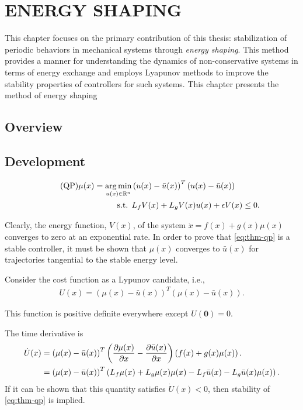 \chapter{\uppercase{Energy Shaping}}

This chapter focuses on the primary contribution of this thesis: stabilization of periodic behaviors in mechanical systems through {\em energy shaping}.
%
This method provides a manner for understanding the dynamics of non-conservative systems in terms of energy exchange and employs Lyapunov methods to improve the stability properties of controllers for such systems.
%
This chapter presents the method of energy shaping 

\section{Overview}

\section{Development}

\begin{align}
  \label{eq:thm-qp} \tag {QP}
  \mu(x) = \operatorname*{arg\,min}_{u(x) \in \mathbb{R}^{n}} & \left(u(x) - {\bar u}(x)\right)^T \left(u(x) - {\bar u}(x) \right)\\
  \nonumber
  \mbox{s.t. } & L_{f} V(x) + L_{g} V(x) u(x) + \epsilon V(x) \leq 0.
\end{align}

Clearly, the energy function, $V(x)$, of the system ${\dot x} = f(x) + g(x) \mu(x)$ converges to zero at an exponential rate. In order to prove that \eqref{eq:thm-qp} is a stable controller, it must be shown that $\mu(x)$ converges to ${\bar u}(x)$ for trajectories tangential to the stable energy level.

Consider the cost function as a Lypunov candidate, i.e.,
\begin{align*}
  U(x) = \left(\mu(x) - {\bar u}(x)\right)^T \left(\mu(x) - {\bar u}(x) \right).
\end{align*}

This function is positive definite everywhere except $U(\mathbf{0}) = 0$.

The time derivative is
\begin{align*}
  {\dot U}(x) &= \left(\mu(x) - {\bar u}(x)\right)^T \left(\frac{\partial{\mu(x)}}{\partial{x}} - \frac{\partial{{\bar u}(x)}}{\partial{x}}\right) \left(f(x) + g(x) \mu(x)\right).\\
  &= \left(\mu(x) - {\bar u}(x)\right)^T \left(L_{f} \mu(x) + L_{g} \mu(x) \mu(x)
  - L_{f} {\bar u}(x) - L_{g} {\bar u}(x) \mu(x) \right).
\end{align*}
If it can be shown that this quantity satisfies ${\dot U}(x) < 0$, then stability of \eqref{eq:thm-qp} is implied.
